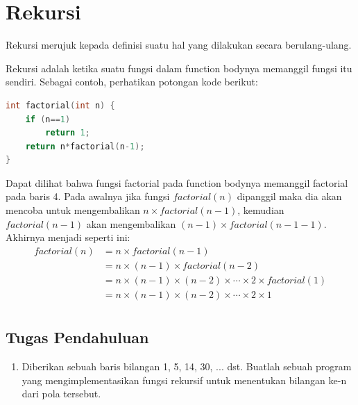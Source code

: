 \section{Rekursi}
Rekursi merujuk kepada definisi suatu hal yang dilakukan secara berulang-ulang.

Rekursi adalah ketika suatu fungsi dalam function bodynya memanggil fungsi itu sendiri.
Sebagai contoh, perhatikan potongan kode berikut:
\begin{lstlisting}[language=c,caption = Factorial dengan rekursi,label=lst:recursionexample01]
int factorial(int n) {
    if (n==1)
        return 1;
    return n*factorial(n-1);
}
\end{lstlisting}
Dapat dilihat bahwa fungsi factorial pada function bodynya memanggil factorial pada baris 4.
Pada awalnya jika fungsi $factorial(n)$ dipanggil maka dia akan mencoba untuk mengembalikan
$n\times factorial(n-1)$, kemudian $factorial(n-1)$ akan mengembalikan $(n-1)\times factorial(n-1-1)$.
Akhirnya menjadi seperti ini:
\begin{equation*}
    \begin{split}
        factorial(n)& = n \times factorial(n-1)\\
        & = n \times (n-1) \times factorial(n-2)\\
        & = n \times (n-1) \times (n-2) \times \cdots \times 2 \times factorial(1)\\
        & = n \times (n-1) \times (n-2) \times \cdots \times 2 \times 1\\
    \end{split}
\end{equation*}

\subsection{Tugas Pendahuluan}
\begin{enumerate}
   \item Diberikan sebuah baris bilangan 1, 5, 14, 30, ... dst. Buatlah sebuah program yang mengimplementasikan fungsi rekursif untuk menentukan bilangan ke-n dari pola tersebut.
\end{enumerate}